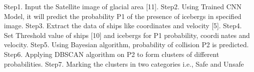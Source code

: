 Step1. Input the Satellite image of glacial area [11].
Step2. Using Trained CNN Model, it will predict the probability P1 of the presence
of icebergs in specified image.
Step3. Extract the data of ships like coordinates and velocity [5].
Step4. Set Threshold value of ships [10] and icebergs for P1 probability, coordinates and velocity.
Step5. Using Bayesian algorithm, probability of collision P2 is predicted.
Step6. Applying DBSCAN algorithm on P2 to form clusters of different
probabilities.
Step7. Marking the clusters in two categories i.e., Safe and Unsafe

